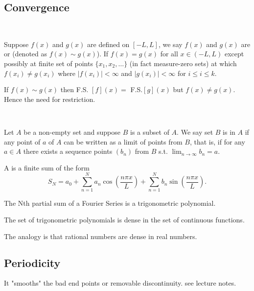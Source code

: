 \documentclass[class=article,crop=false]{standalone}
\begin{document}
\subsection{Convergence}

~\begin{defn}[]
	Suppose $f(x)$ and  $g(x)$ are defined on  $[-L,L]$, we say  $f(x)$ and  $g(x)$ are   or  (denoted as $f(x) \sim g(x)$). If $f(x)=g(x)$ for all  $x \in (-L,L)$ except possibly at finite set of points $\{x_1,x_2,\ldots\} $ (in fact measure-zero sets) at which $f(x_i) \neq g(x_i)$ where $|f(x_i)|<\infty$ and $|g(x_i)|<\infty$ for $i\leq i \leq k$. 
\end{defn}

\begin{note}[]
	If $f(x) \sim g(x)$ then  F.S. $[f](x) =$ F.S.$[g](x)$ but $f(x) \neq g(x)$. Hence the need for restriction.
\end{note}

~\begin{defn}[dense]
	Let $A$ be a non-empty set and suppose  $B$ is a subset of  $A$. We say set  $B$ is   in $A$ if any point of  $a$ of  $A$ can be written as a limit of points from  $B$, that is, if for any  $a \in A$ there exists a sequence points $(b_n)$ from  $B$ s.t.  $\lim_{ n \to \infty} b_n=a$. 
\end{defn}

\begin{defn}
	A  is a finite sum of the form
	\[
		S_N = a_0 + \sum_{ n= 1}^{ N} a_n \cos\left( \frac{n\pi x}{L} \right)  + \sum_{ n= 1}^{ N} b_n \sin\left( \frac{n \pi x}{L} \right) 
	.\] 
\end{defn}
\begin{note}[]
 The Nth partial sum of a Fourier Series is a trigonometric polynomial.
\end{note}

\begin{prop}[]
The set of trigonometric polynomials is dense in the set of continuous functions.
\end{prop}

\begin{intuition}
	The analogy is that rational numbers are dense in real numbers.
\end{intuition}

\subsection{Periodicity}
It "smooths" the bad end points or removable discontinuity. see lecture notes.\\
\end{document}
